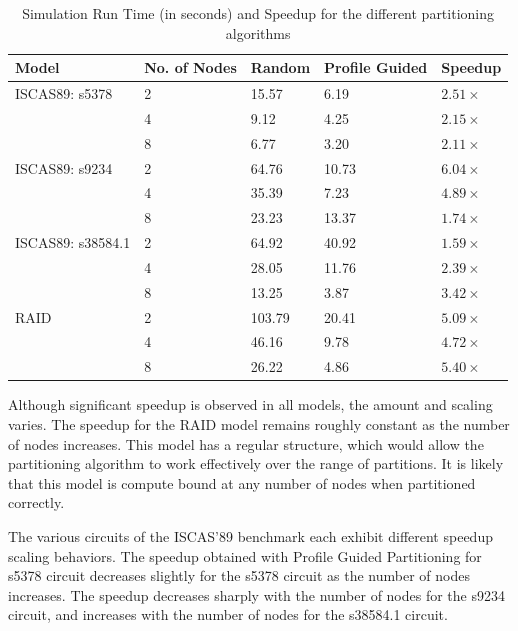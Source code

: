 \documentclass{wscpaperproc}
\begin{document}
\begin{table}[t]
\centering
\begin{tabular}{@{}lllll@{}}
\toprule
Model             & No. of Nodes & Random & Profile Guided & Speedup           \\ \midrule
ISCAS89: s5378    & 2            & 15.57  & 6.19           & \(2.51\times\)    \\
                  & 4            & 9.12   & 4.25           & \(2.15\times\)    \\
                  & 8            & 6.77   & 3.20           & \(2.11\times\)    \\ \midrule
ISCAS89: s9234    & 2            & 64.76  & 10.73          & \(6.04\times\)    \\
                  & 4            & 35.39  & 7.23           & \(4.89\times\)    \\
                  & 8            & 23.23  & 13.37          & \(1.74\times\)    \\ \midrule
ISCAS89: s38584.1 & 2            & 64.92  & 40.92          & \(1.59\times\)    \\
                  & 4            & 28.05  & 11.76          & \(2.39\times\)    \\
                  & 8            & 13.25  & 3.87           & \(3.42\times\)    \\ \midrule
RAID              & 2            & 103.79 & 20.41          & \(5.09\times\)    \\
                  & 4            & 46.16  & 9.78           & \(4.72\times\)    \\
                  & 8            & 26.22  & 4.86           & \(5.40\times\)    \\ \bottomrule
\end{tabular}
\caption{Simulation Run Time (in seconds) and Speedup for the different partitioning algorithms}
\label{table:benchmarks}
\end{table}

Although significant speedup is observed in all models, the amount and scaling varies. The speedup for the RAID model remains roughly constant as the number of nodes increases. This model has a regular structure, which would allow the partitioning algorithm to work effectively over the range of partitions. It is likely that this model is compute bound at any number of nodes when partitioned correctly.

The various circuits of the ISCAS'89 benchmark each exhibit different speedup scaling behaviors. The speedup obtained with Profile Guided Partitioning for s5378 circuit decreases slightly for the s5378 circuit as the number of nodes increases. The speedup decreases sharply with the number of nodes for the s9234 circuit, and increases with the number of nodes for the s38584.1 circuit.
\end{document}
